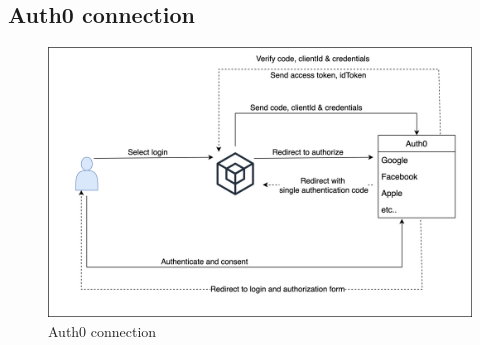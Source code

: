 \documentclass[../Main.tex]{subfiles}
\begin{document}
\subsection{Auth0 connection}
\begin{figure}[H]
 \centering
 \includegraphics[scale=0.14]{Figure/Oauth-connection.png}
    \caption{Auth0 connection}
    \label{fig:Auth0-connection}
\end{figure}
\end{document}
